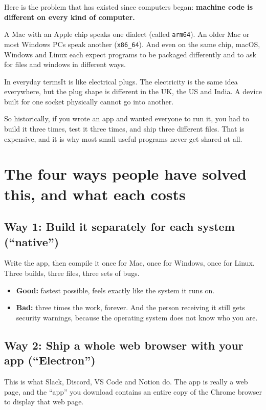 \documentclass[11pt,a4paper]{report}
\newcommand{\analogy}[1]{\begin{plainbox}{In everyday terms}#1\end{plainbox}}
\begin{document}
Here is the problem that has existed since computers began: \textbf{machine
code is different on every kind of computer.}

A Mac with an Apple chip speaks one dialect (called \texttt{arm64}). An
older Mac or most Windows PCs speak another (\texttt{x86\_64}). And even
on the same chip, macOS, Windows and Linux each expect programs to be
packaged differently and to ask for files and windows in different ways.

\analogy{It is like electrical plugs. The electricity is the same idea
everywhere, but the plug shape is different in the UK, the US and India.
A device built for one socket physically cannot go into another.}

So historically, if you wrote an app and wanted everyone to run it, you had
to build it three times, test it three times, and ship three different
files. That is expensive, and it is why most small useful programs never
get shared at all.

\section{The four ways people have solved this, and what each costs}

\subsection{Way 1: Build it separately for each system (``native'')}

Write the app, then compile it once for Mac, once for Windows, once for
Linux. Three builds, three files, three sets of bugs.

\begin{itemize}[leftmargin=*]
  \item \textbf{Good:} fastest possible, feels exactly like the system it
    runs on.
  \item \textbf{Bad:} three times the work, forever. And the person
    receiving it still gets security warnings, because the operating
    system does not know who you are.
\end{itemize}

\subsection{Way 2: Ship a whole web browser with your app (``Electron'')}

This is what Slack, Discord, VS Code and Notion do. The app is really a
web page, and the ``app'' you download contains an entire copy of the
Chrome browser to display that web page.
\end{document}
